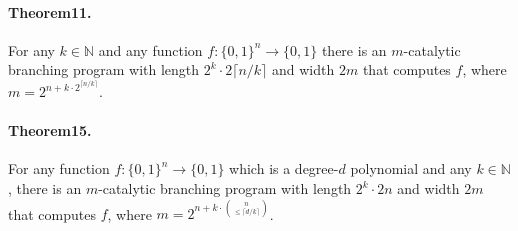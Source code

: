 \paragraph{Theorem11.} For any $k\in\mathbb N$ and any function $f:\{0,1\}^n\to\{0,1\}$ there is an $m$-catalytic branching program with length $2^k\cdot2\lceil n/k\rceil$ and width $2m$ that computes $f$, where $m=2^{n+k\cdot2^{\lceil n/k\rceil}}$.
\paragraph{Theorem15.} For any function $f:\{0,1\}^n\to\{0,1\}$ which is a degree-$d$ polynomial and any $k\in\mathbb N$, there is an $m$-catalytic branching program with length $2^k\cdot2n$ and width $2m$ that computes $f$, where $m=2^{n+k\cdot\binom n{\leq\lceil d/k\rceil}}$.
